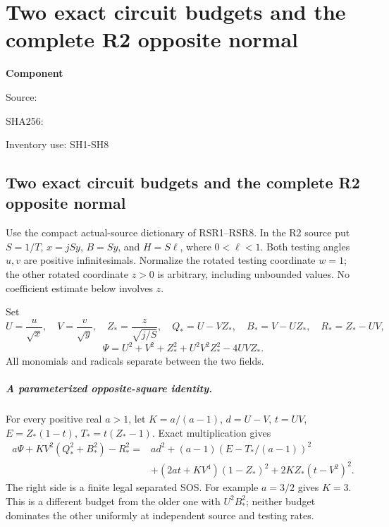 \chapter{Two exact circuit budgets and the complete R2 opposite normal}
\label{component:p09b2107cc05e}
\noindent\textbf{Component }\par
{\small\noindent Source: \par}
{\small\noindent SHA256: \par}
{\small\noindent Inventory use: SH1-SH8\par}
\medskip
\section{Two exact circuit budgets and the complete R2 opposite normal}

Use the compact actual-source dictionary of RSR1--RSR8.  In the R2
source put \(S=1/T\), \(x=jSy\), \(B=Sy\), and \(H=S\ell\), where
\(0<\ell<1\).  Both testing angles \(u,v\) are positive
infinitesimals.  Normalize the rotated testing coordinate \(w=1\);
the other rotated coordinate \(z>0\) is arbitrary, including
unbounded values.  No coefficient estimate below involves \(z\).

Set
\[
 U=\frac{u}{\sqrt x},\quad V=\frac v{\sqrt y},\quad
 Z_*=\frac z{\sqrt{j/S}},\quad
 Q_*=U-VZ_*,\quad B_*=V-UZ_*,\quad R_*=Z_*-UV,
\]
\[
 \Psi=U^2+V^2+Z_*^2+U^2V^2Z_*^2-4UVZ_*.
\]
All monomials and radicals separate between the two fields.

\paragraph{A parameterized opposite-square identity.}
For every positive real \(a>1\), let \(K=a/(a-1)\),
\(d=U-V\), \(t=UV\), \(E=Z_*(1-t)\), \(T_*=t(Z_*-1)\).
Exact multiplication gives
\[
\begin{split}
 a\Psi+K V^2(Q_*^2+B_*^2)-R_*^2
 ={}&a d^2+(a-1)(E-T_*/(a-1))^2\\
 &+(2at+KV^4)(1-Z_*)^2+2KZ_*(t-V^2)^2 .
\end{split}                                                     \tag{SH1}
\]
The right side is a finite legal separated SOS.  For example
\(a=3/2\) gives \(K=3\).  This is a different budget from the
older one with \(U^2B_*^2\); neither budget dominates the other
uniformly at independent source and testing rates.

